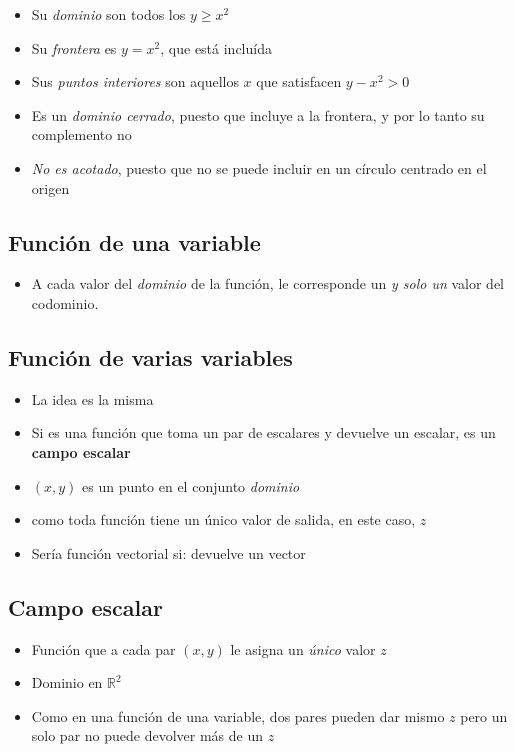 \begin{itemize}
    \item Su \textit{dominio} son todos los \(y \geq x^{2}\)
    \item Su \textit{frontera} es \(y = x^{2}\), que está incluída
    \item Sus \textit{puntos interiores} son aquellos \(x\) que satisfacen 
    \(y - x^{2} > 0\)
    \item Es un \textit{dominio cerrado}, puesto que incluye a la frontera,
    y por lo tanto su complemento no
    \item \textit{No es acotado}, puesto que no se puede incluir en un círculo
    centrado en el origen
\end{itemize}

\subsection{Función de una variable}

\begin{itemize}
    \item A cada valor del \textit{dominio} de la función,
    le corresponde un \textit{y solo un} valor del codominio.
\end{itemize}

\subsection{Función de varias variables}
\begin{itemize}
    \item La idea es la misma 
    \item Si es una función que toma un par de escalares y devuelve un escalar,
    es un \textbf{campo escalar}
    \item \((x,y)\) es un punto en el conjunto \textit{dominio}
    \item como toda función tiene un único valor de salida, en este caso, \(z\)
    \item Sería función vectorial si: devuelve un vector
\end{itemize}

\subsection{Campo escalar}
\begin{itemize}
    \item Función que a cada par \((x,y)\) le asigna un \textit{único} valor \(z\)
    \item Dominio en \(\mathbb{R}^{2}\)
    \item Como en una función de una variable, dos pares pueden dar mismo \(z\)
    pero un solo par no puede devolver más de un \(z\)
\end{itemize}

